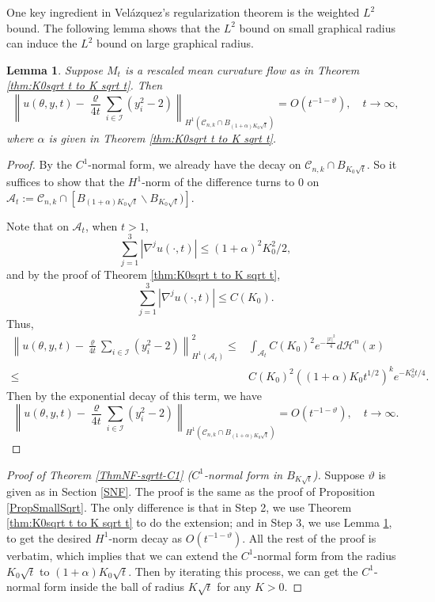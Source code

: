 \documentclass[11pt]{amsart}
\numberwithin{equation}{section}
\newtheorem{lemma}[theorem]{Lemma}
\numberwithin{equation}{section}
\newcommand{\cA}{\mathcal{A}}
\newcommand{\cH}{\mathcal{H}}
\newcommand{\cC}{\mathcal{C}}
\newcommand{\cI}{\mathcal{I}}
\begin{document}
	
	One key ingredient in Vel\'azquez's regularization theorem is the weighted $L^2$ bound. The following lemma shows that the $L^2$ bound on small graphical radius can induce the $L^2$ bound on large graphical radius.
	
	\begin{lemma}\label{lem:K0sqrt t to K sqrt t L2 norm}
		Suppose $M_t$ is a rescaled mean curvature flow as in Theorem \ref{thm:K0sqrt t to K sqrt t}. Then 
		\[
		\left\| u(\theta,y,t)-
		\frac{\varrho}{4t}\sum_{i\in\cI }(y_i^2-2)
		\right\|_{H^1(\cC_{n,k}\cap B_{(1+\alpha)K_0\sqrt{t}})}=O(t^{-1-\vartheta}),\quad
		t\to\infty,
		\]
		where $\alpha$ is given in Theorem \ref{thm:K0sqrt t to K sqrt t}. 
	\end{lemma}
	\begin{proof}
		By the $C^1$-normal form, we already have the decay on $\cC_{n,k}\cap B_{K_0\sqrt{t}}$. So it suffices to show that the $H^1$-norm of the difference turns to $0$ on $\cA_t:=\cC_{n,k}\cap [B_{(1+\alpha)K_0\sqrt{t}}\backslash B_{K_0\sqrt{t}})]$.
		
		Note that on $\cA_t$, when $t>1$,
		\[
		\sum_{j=1}^3|\nabla^j u(\cdot,t)|
		\leq 
		(1+\alpha)^2 K_0^2/2,
		\]
		and by the proof of Theorem \ref{thm:K0sqrt t to K sqrt t}, 
		\[
		\sum_{j=1}^3|\nabla^j u(\cdot,t)|
		\leq
		C(K_0).
		\]
		Thus,
		\begin{align*}
			\left\| u(\theta,y,t)-
			\frac{\varrho}{4t}\sum_{i\in\cI }(y_i^2-2)
			\right\|^2_{H^1(\cA_t)}
			\leq& \int_{\cA_t} C(K_0)^2 e^{-\frac{|x|^2}{4}}d\cH^n(x)
			\\
			\leq &
			C(K_0)^2( (1+\alpha)K_0t^{1/2})^k e^{-K_0^2t/4}.
		\end{align*}
		Then by the exponential decay of this term, we have
		\[
		\left\| u(\theta,y,t)-
		\frac{\varrho}{4t}\sum_{i\in\cI }(y_i^2-2)
		\right\|_{H^1(\cC_{n,k}\cap B_{(1+\alpha)K_0\sqrt{t}})}=O(t^{-1-\vartheta}),\quad
		t\to\infty.
		\]
	\end{proof}
	
	
	\begin{proof}[Proof of Theorem \ref{ThmNF-sqrtt-C1} ($C^1$-normal form in $B_{K\sqrt{t}}$)]
		Suppose $\vartheta$ is given as in Section \ref{SNF}. The proof is the same as the proof of Proposition \ref{PropSmallSqrt}. The only difference is that in Step 2, we use Theorem \ref{thm:K0sqrt t to K sqrt t} to do the extension; and in Step 3, we use Lemma \ref{lem:K0sqrt t to K sqrt t L2 norm}, to get the desired $H^1$-norm decay as $O(t^{-1-\vartheta})$. All the rest of the proof is verbatim, which implies that we can extend the $C^1$-normal form from the radius $K_0\sqrt{t}$ to $(1+\alpha)K_0\sqrt{t}$. Then by iterating this process, we can get the $C^1$-normal form inside the ball of radius $K\sqrt{t}$ for any $K>0$.
	\end{proof}
	
\end{document}
